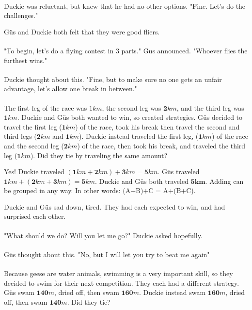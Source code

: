 \paragraph{} Duckie was reluctant, but knew that he had no other options. "Fine. Let's do the challenges."
\pagebreak
{}
{Güs and Duckie both felt that they were good fliers. 
\paragraph{} "To begin, let's do a flying contest in 3 parts." Gus announced. "Whoever flies the furthest wins."
\paragraph{} Duckie thought about this. "Fine, but to make sure no one gets an unfair advantage, let's allow one break in between."
\paragraph{} The first leg of the race was $1 km$, the second leg was $\mathbf{2} km$, and the third leg was $\mathbf{1} km$. Duckie and Güs both wanted to win, so created strategies. Güs decided to travel the first leg ($\mathbf{1} km$) of the race, took his break then travel the second and third legs ($\mathbf{2} km$ and $\mathbf{1} km$). Duckie instead traveled the first leg, ($\mathbf{1} km$) of the race and the second leg ($\mathbf{2} km$) of the race, then took his break, and traveled the third leg ($\mathbf{1} km$). Did they tie by traveling the same amount?}
{Yes! Duckie traveled $(\mathbf{1} km + \mathbf{2} km) + \mathbf{3} km = \mathbf{5} km$. Güs traveled $\mathbf{1} km + (\mathbf{2} km + \mathbf{3} km) = \mathbf{5}km$. Duckie and Güs both traveled $\mathbf{5km}$.}
{Adding can be grouped in any way. In other words: (A+B)+C = A+(B+C).}
{}
{Duckie and Güs sad down, tired. They had each expected to win, and had surprised each other. 
\paragraph{} "What should we do? Will you let me go?" Duckie asked hopefully. \paragraph{} Güs thought about this. "No, but I will let you try to beat me again" 
\paragraph{} Because geese are water animals, swimming is a very important skill, so they decided to swim for their next competition. They each had a different strategy. Güs swam $\mathbf{140} m$, dried off, then swam $\mathbf{160} m$. Duckie instead swam $\mathbf{160} m$, dried off, then swam $\mathbf{140} m$. Did they tie?}
